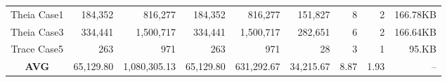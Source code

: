 \begin{table*}[!htb]
{\begin{tabular}{@{}crrrrrrrr@{}}
Theia Case1          & 184,352                                           & 816,277                                           & 184,352                                  & 816,277                                   & 151,827                               & 8                                       & 2                                        & 166.78KB                         \\
Theia Case3          & 334,441                                           & 1,500,717                                         & 334,441                                  & 1,500,717                                 & 282,651                               & 6                                       & 2                                        & 166.64KB                         \\
Trace Case5          & 263                                               & 971                                               & 263                                      & 971                                       & 28                                    & 3                                       & 1                                        & 95.KB                            \\
\textbf{AVG}         & 65,129.80                                            & 1,080,305.13                                         & 65,129.80                                   & 631,292.67                                   & 34,215.67                                & 8.87                                       & 1.93                                        & --                               \\ \bottomrule
\end{tabular}
}
\end{table*}
